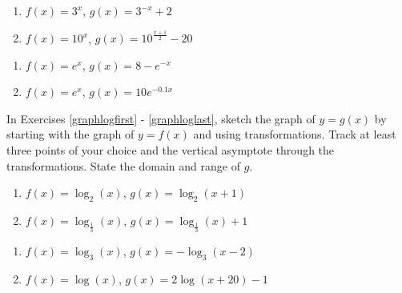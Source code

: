 \begin{multicols}{2}
\begin{enumerate}
\setcounter{enumi}{\value{HW}}

\item  $f(x) = 3^{x}$, $g(x) = 3^{-x}+2$

\item  $f(x) = 10^{x}$, $g(x) = 10^{\frac{x+1}{2}} - 20$  

\setcounter{HW}{\value{enumi}}
\end{enumerate}
\end{multicols}

\begin{multicols}{2}
\begin{enumerate}
\setcounter{enumi}{\value{HW}}

\item  $f(x) = e^{x}$, $g(x) = 8 - e^{-x}$

\item  $f(x) = e^{x}$, $g(x) = 10e^{-0.1x}$ \label{graphexplast}

\setcounter{HW}{\value{enumi}}
\end{enumerate}
\end{multicols}


In Exercises \ref{graphlogfirst} - \ref{graphloglast}, sketch the graph of $y=g(x)$ by starting with the graph of $y = f(x)$ and using transformations.  Track at least three points of your choice and the vertical asymptote through the transformations. State the domain and range of $g$.


\begin{multicols}{2}
\begin{enumerate}
\setcounter{enumi}{\value{HW}}

\item  $f(x) = \log_{2}(x)$, $g(x) = \log_{2}(x+1)$ \label{graphlogfirst}

\item  $f(x) = \log_{\frac{1}{3}}(x)$, $g(x) = \log_{\frac{1}{3}}(x)+1$

\setcounter{HW}{\value{enumi}}
\end{enumerate}
\end{multicols}

\begin{multicols}{2}
\begin{enumerate}
\setcounter{enumi}{\value{HW}}


\item  $f(x) = \log_{3}(x)$, $g(x) = -\log_{3}(x-2)$

\item  $f(x) = \log(x)$, $g(x) = 2\log(x+20) -1$  

\setcounter{HW}{\value{enumi}}
\end{enumerate}
\end{multicols}

